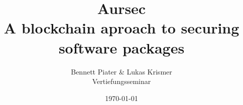 \documentclass[a4paper,11pt]{article}
\title{Aursec\\A blockchain aproach to securing software packages}
\author{Bennett Piater \& Lukas Krismer\\Vertiefungsseminar}
\date{\today}
\begin{document}
  \begin{titlepage}
    \maketitle
    \thispagestyle{empty}
  \end{titlepage}

  \begin{abstract}
  \end{abstract}

  \tableofcontents
  \listoffigures
  \listoftables
  \pagebreak


  \pagebreak
  
  
\end{document}
